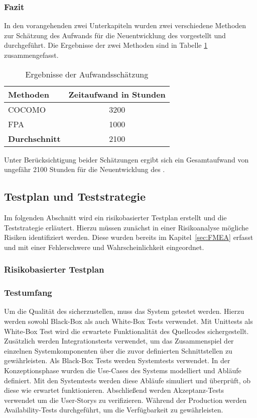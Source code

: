 \subsubsection{Fazit}
In den vorangehenden zwei Unterkapiteln wurden zwei verschiedene Methoden zur Schätzung des Aufwands für die Neuentwicklung des  vorgestellt und durchgeführt.
Die Ergebnisse der zwei Methoden sind in Tabelle \ref{tab:aufwandsschaetzungErgebnisse} zusammengefasst.
\begin{table}[H]
  \centering
  \begin{tabular}{|l|c|}
    \hline
    \textbf{Methoden} & \textbf{Zeitaufwand} in Stunden \\
    \hline
    \ac{COCOMO} & 3200 \\
    \hline
    \ac{FPA} & 1000 \\
    \hline
    \textbf{Durchschnitt} & 2100 \\
    \hline
  \end{tabular}
  \caption{Ergebnisse der Aufwandsschätzung}
  \label{tab:aufwandsschaetzungErgebnisse}
\end{table}

\noindent{}Unter Berücksichtigung beider Schätzungen ergibt sich ein Gesamtaufwand von ungefähr 2100 Stunden für die Neuentwicklung des .

\subsection{Testplan und Teststrategie}
Im folgenden Abschnitt wird ein risikobasierter Testplan erstellt und die Teststrategie erläutert.
Hierzu müssen zunächst in einer Risikoanalyse mögliche Risiken identifiziert werden.
Diese wurden bereits im Kapitel~\ref{sec:FMEA} erfasst und mit einer Fehlerschwere und Wahrscheinlichkeit eingeordnet.
\subsubsection{Risikobasierter Testplan}
\subsubsection*{Testumfang}
Um die Qualität des  sicherzustellen, muss das System getestet werden.
Hierzu werden sowohl Black-Box als auch White-Box Tests verwendet.
Mit Unittests als White-Box Test wird die erwartete Funktionalität des Quellcodes sichergestellt.
Zusätzlich werden Integrationstests verwendet, um das Zusammenspiel der einzelnen Systemkomponenten über die zuvor definierten Schnittstellen zu gewährleisten.
\newparagraph
Als Black-Box Tests werden Systemtests verwendet.
In der Konzeptionsphase wurden die Use-Cases des Systems modelliert und Abläufe definiert.
Mit den Systemtests werden diese Abläufe simuliert und überprüft, ob diese wie erwartet funktionieren.
Abschließend werden Akzeptanz-Tests verwendet um die User-Storys zu verifizieren.
Während der Production werden Availability-Tests durchgeführt, um die Verfügbarkeit zu gewährleisten.
